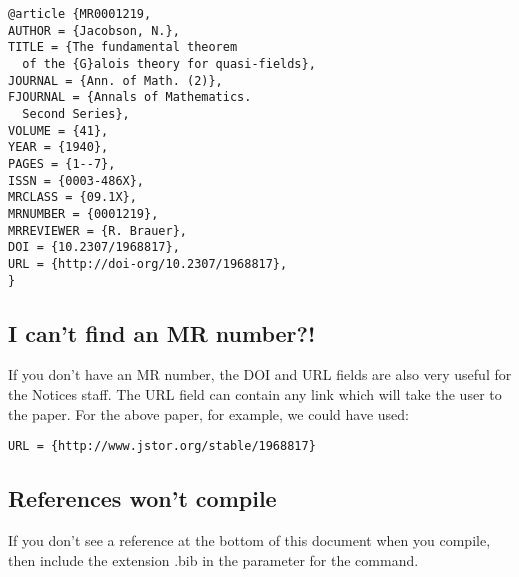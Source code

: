 \documentclass{notices}
\begin{document}
\begin{verbatim}
@article {MR0001219,
AUTHOR = {Jacobson, N.},
TITLE = {The fundamental theorem
  of the {G}alois theory for quasi-fields},
JOURNAL = {Ann. of Math. (2)},
FJOURNAL = {Annals of Mathematics.
  Second Series},
VOLUME = {41},
YEAR = {1940},
PAGES = {1--7},
ISSN = {0003-486X},
MRCLASS = {09.1X},
MRNUMBER = {0001219},
MRREVIEWER = {R. Brauer},
DOI = {10.2307/1968817},
URL = {http://doi-org/10.2307/1968817},
}
\end{verbatim}

\subsection*{I can't find an MR number?!}

If you don't have an MR number, the DOI and URL fields are also very useful for
the Notices staff. The URL field can contain any link which will take the
user to the paper. For the above paper, for example, we could have used:
\begin{verbatim}
URL = {http://www.jstor.org/stable/1968817}
\end{verbatim}

\subsection*{References won't compile}

If you don't see a reference at the bottom of this document when you compile, 
then include the extension .bib in the parameter for the \verb!!
command.

%

\end{document}
